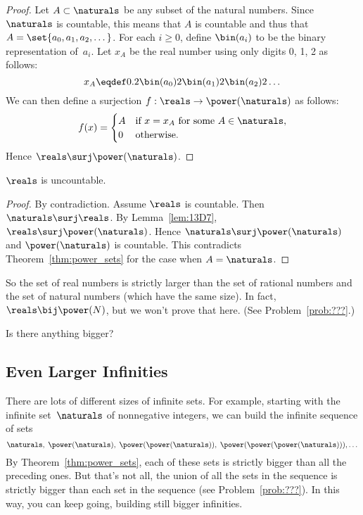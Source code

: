 \begin{proof}
Let $A \subset \naturals$ be any subset of the natural numbers.  Since
$\naturals$ is countable, this means that $A$ is countable and thus
that $A = \set{a_0, a_1, a_2, \dots}$.  For each $i \ge 0$, define
$\bin(a_i)$ to be the binary representation of~$a_i$.  Let $x_A$ be
the real number using only digits 0, 1, 2 as follows:
\begin{equation}\label{eqn:13D9}
    x_A \eqdef 0.2 \bin(a_0) 2 \bin(a_1) 2 \bin(a_2) 2 \dots
\end{equation}
We can then define a surjection $f : \reals \to \power(\naturals)$ as
follows:
\begin{equation*}
f(x) = \begin{cases}
        A & \text{if $x = x_A$ for some $A \in \naturals$}, \\
        0 & \text{otherwise}.
       \end{cases}
\end{equation*}
Hence $\reals \surj \power(\naturals)$.
\end{proof}

\begin{corollary}\label{cor:reals_uncountable}
$\reals$ is uncountable.
\end{corollary}

\begin{proof}
By contradiction.  Assume $\reals$ is countable.  Then $\naturals
\surj \reals$.  By Lemma~\ref{lem:13D7}, $\reals \surj
\power(\naturals)$.  Hence $\naturals \surj \power(\naturals)$ and
$\power(\naturals)$ is countable.  This contradicts
Theorem~\ref{thm:power_sets} for the case when $A = \naturals$.
\end{proof}

So the set of real numbers is strictly larger than the set of rational
numbers and the set of natural numbers (which have the same size).  In
fact, $\reals \bij \power(N)$, but we won't prove that here.  (See
Problem~\ref{prob:???}.)

Is there anything bigger?

\subsection{Even Larger Infinities}

There are lots of different sizes of infinite sets.  For example,
starting with the infinite set~$\naturals$ of nonnegative integers, we
can build the infinite sequence of sets
\begin{equation*}
    \naturals, \; \power(\naturals), \; \power(\power(\naturals)), \;
    \power(\power(\power(\naturals))), \dots
\end{equation*}
By Theorem~\ref{thm:power_sets}, each of these sets is strictly bigger
than all the preceding ones.  But that's not all, the union of all the
sets in the sequence is strictly bigger than each set in the sequence
(see Problem~\ref{prob:???}).  In this way, you can keep going,
building still bigger infinities.

